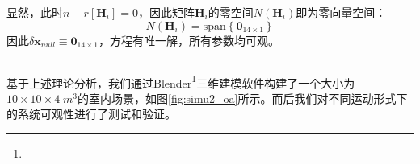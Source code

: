 显然，此时$n-r\left[ \boldsymbol{H}_i\right] =0$，因此矩阵$\boldsymbol{H}_i$的零空间$N(\boldsymbol{H}_i)$即为零向量空间：
\begin{equation}
  N(\boldsymbol{H}_i)=\mathrm{span}\left\lbrace
  \boldsymbol{0}_{14\times 1}
  \right\rbrace
\end{equation}
因此$\delta\boldsymbol{x}_{null}\equiv\boldsymbol{0}_{14\times 1}$，方程有唯一解，所有参数均可观。

\subsection{}
基于上述理论分析，我们通过Blender\footnote{}三维建模软件构建了一个大小为$10\times 10\times 4\; m^3$的室内场景，如图\ref{fig:simu2_oa}所示。而后我们对不同运动形式下的系统可观性进行了测试和验证。

